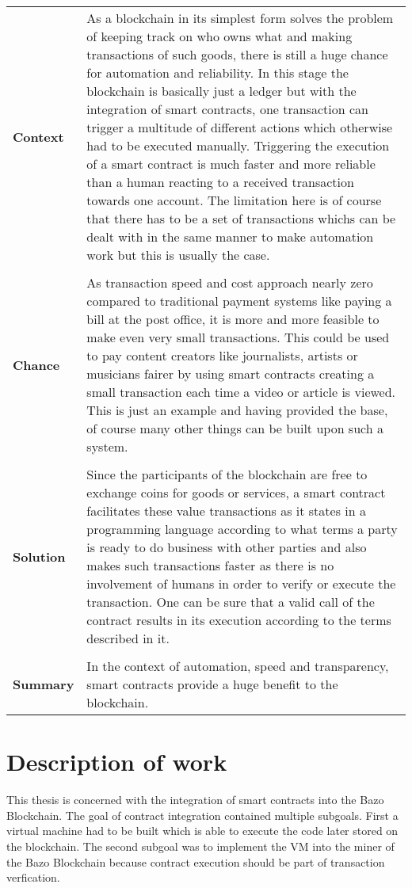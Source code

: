 \begin{tabular}[t]{ p{3cm} p{12.5cm}}
\textbf{Context} & 
As a blockchain in its simplest form solves the problem of keeping track on who owns what and making transactions of such goods, there is still a huge chance for automation and reliability. In this stage the blockchain is basically just a ledger but with the integration of smart contracts, one transaction can trigger a multitude of different actions which otherwise had to be executed manually. Triggering the execution of a smart contract is much faster and more reliable than a human reacting to a received transaction towards one account. The limitation here is of course that there has to be a set of transactions whichs can be dealt with in the same manner to make automation work but this is usually the case. \\ \\

\textbf{Chance} & 
As transaction speed and cost approach nearly zero compared to traditional payment systems like paying a bill at the post office, it is more and more feasible to make even very small transactions. This could be used to pay content creators like journalists, artists or musicians fairer by using smart contracts creating a small transaction each time a video or article is viewed. This is just an example and having provided the base, of course many other things can be built upon such a system.\\ \\

\textbf{Solution} & 
Since the participants of the blockchain are free to exchange coins for goods or services, a smart contract facilitates these value transactions as it states in a programming language according to what terms a party is ready to do business with other parties and also makes such transactions faster as there is no involvement of humans in order to verify or execute the transaction. One can be sure that a valid call of the contract results in its execution according to the terms described in it. \\ \\

\textbf{Summary} & 
In the context of automation, speed and transparency, smart contracts provide a huge benefit to the blockchain.

\end{tabular}

\section{Description of work}
This thesis is concerned with the integration of smart contracts into the Bazo Blockchain. The goal of contract integration contained multiple subgoals. First a virtual machine had to be built which is able to execute the code later stored on the blockchain. The second subgoal was to implement the VM into the miner of the Bazo Blockchain because contract execution should be part of transaction verfication.